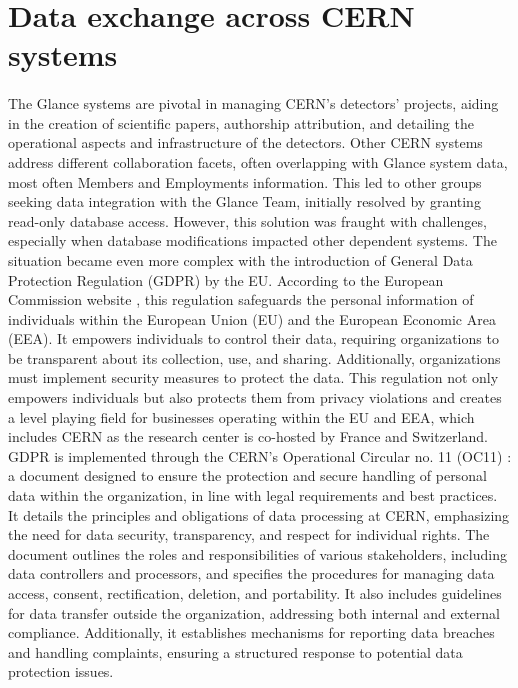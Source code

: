 \section{Data exchange across CERN systems} 

\paragraph{} The Glance systems are pivotal in managing CERN's detectors' projects, aiding in the creation of scientific papers, authorship attribution, and detailing the operational aspects and infrastructure of the detectors. Other CERN systems address different collaboration facets, often overlapping with Glance system data, most often Members and Employments information. This led to other groups seeking data integration with the Glance Team, initially resolved by granting read-only database access. However, this solution was fraught with challenges, especially when database modifications impacted other dependent systems. The situation became even more complex with the introduction of General Data Protection Regulation (GDPR) by the EU. According to the European Commission website \cite{eu_data_protection_explained}, this regulation safeguards the personal information of individuals within the European Union (EU) and the European Economic Area (EEA). It empowers individuals to control their data, requiring organizations to be transparent about its collection, use, and sharing. Additionally, organizations must implement security measures to protect the data. This regulation not only empowers individuals but also protects them from privacy violations and creates a level playing field for businesses operating within the EU and EEA, which includes CERN as the research center is co-hosted by France and Switzerland. GDPR is implemented through the CERN's Operational Circular no. 11 (OC11) \cite{cern_oc_11}: a document designed to ensure the protection and secure handling of personal data within the organization, in line with legal requirements and best practices. It details the principles and obligations of data processing at CERN, emphasizing the need for data security, transparency, and respect for individual rights. The document outlines the roles and responsibilities of various stakeholders, including data controllers and processors, and specifies the procedures for managing data access, consent, rectification, deletion, and portability. It also includes guidelines for data transfer outside the organization, addressing both internal and external compliance. Additionally, it establishes mechanisms for reporting data breaches and handling complaints, ensuring a structured response to potential data protection issues. 

